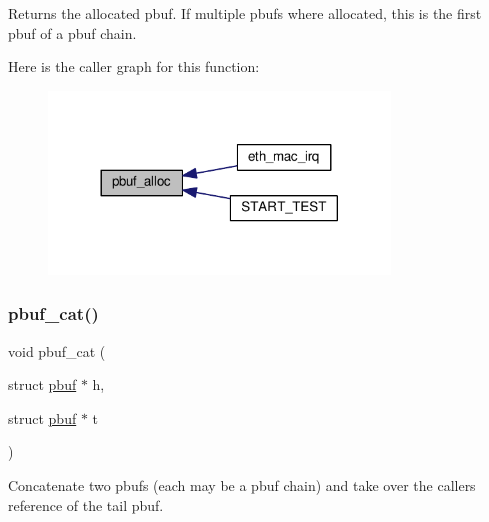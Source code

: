 \begin{DoxyReturn}{Returns}
the allocated pbuf. If multiple pbufs where allocated, this is the first pbuf of a pbuf chain. 
\end{DoxyReturn}
Here is the caller graph for this function\+:
\nopagebreak
\begin{figure}[H]
\begin{center}
\leavevmode
\includegraphics[width=257pt]{group__pbuf_ga8bb9c5d54a06995b1c67ce695ead9969_icgraph}
\end{center}
\end{figure}
\mbox{\label{group__pbuf_ga82429084fe29015509c9b4a072707cd4}} 
\subsubsection{\texorpdfstring{pbuf\+\_\+cat()}{pbuf\_cat()}}
{\footnotesize\ttfamily void pbuf\+\_\+cat (\begin{DoxyParamCaption}\item[{struct \hyperlink{structpbuf}{pbuf} $\ast$}]{h,  }\item[{struct \hyperlink{structpbuf}{pbuf} $\ast$}]{t }\end{DoxyParamCaption})}

Concatenate two pbufs (each may be a pbuf chain) and take over the caller\textquotesingle{}s reference of the tail pbuf.

